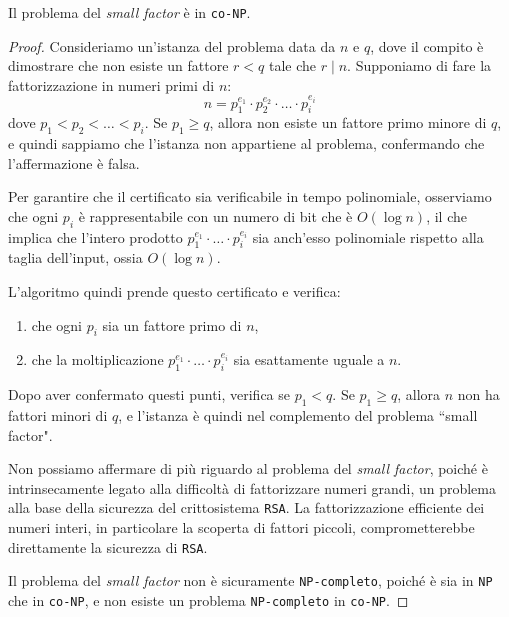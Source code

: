 \begin{theorem}
    Il problema del \textit{small factor} è in \texttt{co-NP}.
\end{theorem}
\begin{proof}
    Consideriamo un'istanza del problema data da $n$ e $q$, dove il compito è dimostrare che non esiste un
    fattore $r < q$ tale che $r \mid n$. Supponiamo di fare la fattorizzazione in numeri primi di $n$:
    \[
        n = p_1^{e_1} \cdot p_2^{e_2} \cdot \ldots \cdot p_i^{e_i}
    \]
    dove $p_1 < p_2 < \ldots < p_i$. Se $p_1 \geq q$, allora non esiste un fattore primo minore di $q$, e
    quindi sappiamo che l'istanza non appartiene al problema, confermando che l'affermazione è falsa.

    Per garantire che il certificato sia verificabile in tempo polinomiale, osserviamo che ogni $p_i$ è
    rappresentabile con un numero di bit che è $O(\log n)$, il che implica che l'intero prodotto $p_1^{e_1}
    \cdot \ldots \cdot p_i^{e_i}$ sia anch'esso polinomiale rispetto alla taglia dell'input, ossia $O(\log n)$.

    L'algoritmo quindi prende questo certificato e verifica:
    \begin{enumerate}
        \item che ogni $p_i$ sia un fattore primo di $n$,
        \item che la moltiplicazione $p_1^{e_1} \cdot \ldots \cdot p_i^{e_i}$ sia esattamente uguale a $n$.
    \end{enumerate}
    Dopo aver confermato questi punti, verifica se $p_1 < q$. Se $p_1 \geq q$, allora $n$ non ha fattori minori
    di $q$, e l'istanza è quindi nel complemento del problema ``small factor".

    Non possiamo affermare di più riguardo al problema del \textit{small factor}, poiché è intrinsecamente
    legato alla difficoltà di fattorizzare numeri grandi, un problema alla base della sicurezza del
    crittosistema \texttt{RSA}. La fattorizzazione efficiente dei numeri interi, in particolare la scoperta
    di fattori piccoli, comprometterebbe direttamente la sicurezza di \texttt{RSA}.

    Il problema del \textit{small factor} non è sicuramente \texttt{NP-completo}, poiché è sia in \texttt{NP}
    che in \texttt{co-NP}, e non esiste un problema \texttt{NP-completo} in \texttt{co-NP}.
\end{proof}